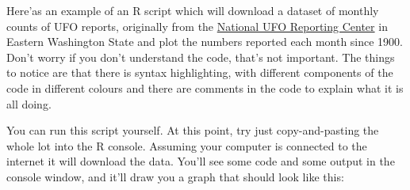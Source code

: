 \documentclass[
]{book}
\newenvironment{Shaded}{\begin{snugshade}}{\end{snugshade}}
\newcommand{\CommentTok}[1]{\textcolor[rgb]{0.56,0.35,0.01}{\textit{#1}}}
\newcommand{\DataTypeTok}[1]{\textcolor[rgb]{0.13,0.29,0.53}{#1}}
\newcommand{\KeywordTok}[1]{\textcolor[rgb]{0.13,0.29,0.53}{\textbf{#1}}}
\newcommand{\NormalTok}[1]{#1}
\newcommand{\OperatorTok}[1]{\textcolor[rgb]{0.81,0.36,0.00}{\textbf{#1}}}
\newcommand{\OtherTok}[1]{\textcolor[rgb]{0.56,0.35,0.01}{#1}}
\newcommand{\StringTok}[1]{\textcolor[rgb]{0.31,0.60,0.02}{#1}}
\begin{document}
Here'as an example of an R script which will download a dataset of monthly counts of UFO reports, originally from the \href{http://www.nuforc.org/}{National UFO Reporting Center} in Eastern Washington State and plot the numbers reported each month since 1900. Don't worry if you don't understand the code, that's not important. The things to notice are that there is syntax highlighting, with different components of the code in different colours and there are comments in the code to explain what it is all doing.

\begin{Shaded}
\end{Shaded}

You can run this script yourself. At this point, try just copy-and-pasting the whole lot into the R console. Assuming your computer is connected to the internet it will download the data. You'll see some code and some output in the console window, and it'll draw you a graph that should look like this:
\end{document}
